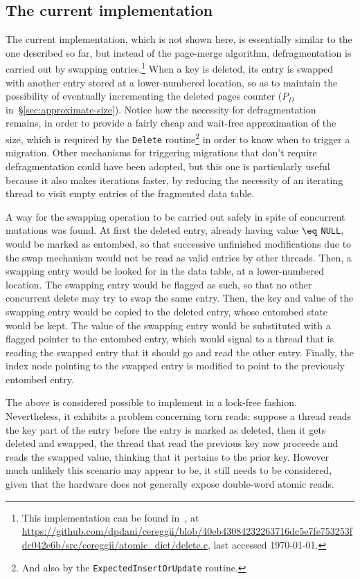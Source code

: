 \subsection{The current implementation}\label{subsec:the-current-implementation}

The current implementation, which is not shown here, is essentially similar to the one described so far, but instead of the page-merge algorithm, defragmentation is carried out by swapping entries.\footnote{%
	This implementation can be found in~\cite{cereggii}, at \url{https://github.com/dpdani/cereggii/blob/40eb43084232263716dc5e7fe753253fdc042e6b/src/cereggii/atomic_dict/delete.c}, last accessed \today.
}
When a key is deleted, its entry is swapped with another entry stored at a lower-numbered location, so as to maintain the possibility of eventually incrementing the deleted pages counter ($P_D$ in~\S\ref{sec:approximate-size}).
Notice how the necessity for defragmentation remains, in order to provide a fairly cheap and wait-free approximation of the size, which is required by the \texttt{Delete} routine\footnote{%
	And also by the \texttt{ExpectedInsertOrUpdate} routine.
} in order to know when to trigger a migration.
Other mechanisms for triggering migrations that don't require defragmentation could have been adopted, but this one is particularly useful because it also makes iterations faster, by reducing the necessity of an iterating thread to visit empty entries of the fragmented data table.

A way for the swapping operation to be carried out safely in spite of concurrent mutations was found.
At first the deleted entry, already having value $\eq$ \texttt{NULL}, would be marked as entombed, so that successive unfinished modifications due to the swap mechanism would not be read as valid entries by other threads.
Then, a swapping entry would be looked for in the data table, at a lower-numbered location.
The swapping entry would be flagged as such, so that no other concurrent delete may try to swap the same entry.
Then, the key and value of the swapping entry would be copied to the deleted entry, whose entombed state would be kept.
The value of the swapping entry would be substituted with a flagged pointer to the entombed entry, which would signal to a thread that is reading the swapped entry that it should go and read the other entry.
Finally, the index node pointing to the swapped entry is modified to point to the previously entombed entry.

The above is considered possible to implement in a lock-free fashion.
Nevertheless, it exhibits a problem concerning torn reads: suppose a thread reads the key part of the entry before the entry is marked as deleted, then it gets deleted and swapped, the thread that read the previous key now proceeds and reads the swapped value, thinking that it pertains to the prior key.
However much unlikely this scenario may appear to be, it still needs to be considered, given that the hardware does not generally expose double-word atomic reads.

